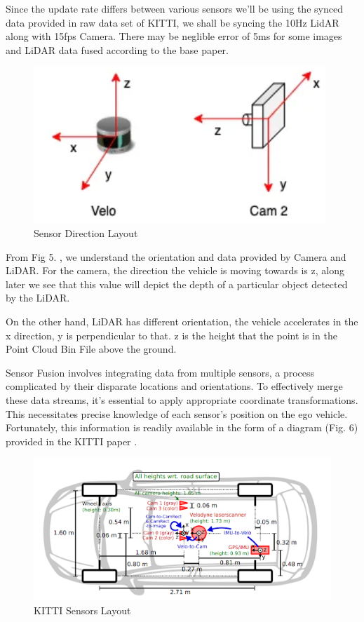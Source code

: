 \documentclass[letterpaper, 10 pt, conference]{ieeeconf}  %
\begin{document}
Since the update rate differs between various sensors we'll be using the synced data provided in raw data set of KITTI, we shall be syncing the 10Hz LidAR along with 15fps Camera. There may be neglible error of 5ms for some images and LiDAR data fused according to the base paper.

\begin{figure}[htbp]
  \centering
  \includegraphics[width=\linewidth]{sensor_directions.png}
  \caption{Sensor Direction Layout}
  \label{Sensor Direction Layout}
\end{figure}

From Fig 5. , we understand the orientation and data provided by Camera and LiDAR. For the camera, the direction the vehicle is moving towards is z, along later we see that this value will depict the depth of a particular object detected by the LiDAR. 

On the other hand, LiDAR has different orientation, the vehicle accelerates in the x direction, y is perpendicular to that. z is the height that the point is in the Point Cloud Bin File above the ground.

Sensor Fusion involves integrating data from multiple sensors, a process complicated by their disparate locations and orientations. To effectively merge these data streams, it's essential to apply appropriate coordinate transformations. This necessitates precise knowledge of each sensor's position on the ego vehicle. Fortunately, this information is readily available in the form of a diagram (Fig. 6) provided in the KITTI paper \cite{KITTI}.

\begin{figure}[htbp]
  \centering
  \includegraphics[width=\linewidth]{KITTI_Layout.png}
  \caption{KITTI Sensors Layout}
  \label{KITTI Sensors Layout}
\end{figure}
\end{document}

